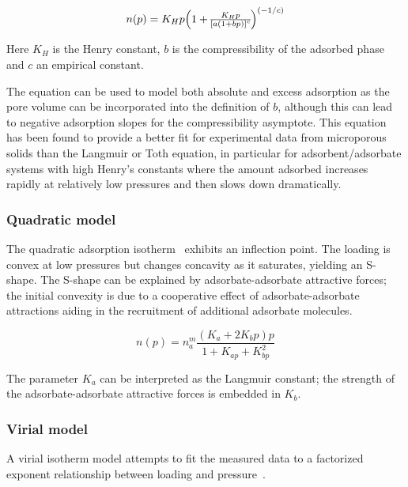 \begin{equation}\label{pyg:eqn:jseaton}
	n(p) = K_H p \Big{(1 + \frac{K_H p}{{[a {(1 + b
									p)}]}^c}\Big)}^{(-1/c)}
\end{equation}

Here \(K_H\) is the Henry constant, \(b\) is the compressibility of
the
adsorbed phase and \(c\) an empirical constant.

The equation can be used to model both absolute and excess adsorption
as the pore
volume can be incorporated into the definition of \(b\), although
this can lead
to negative adsorption slopes for the compressibility asymptote.
This equation has been found to provide a better fit for experimental
data
from microporous solids than the Langmuir or Toth equation, in
particular for
adsorbent/adsorbate systems with high Henry’s constants where the
amount adsorbed
increases rapidly at relatively low pressures and then slows down
dramatically.

\subsubsection{Quadratic model}\label{pyg:models:quadratic}

The quadratic adsorption
isotherm~\cite{hillIntroductionStatisticalThermodynamics1986}
exhibits an inflection point. The loading is convex at low
pressures but changes concavity as it saturates, yielding
an S-shape. The S-shape can be explained by adsorbate-adsorbate
attractive
forces; the initial convexity is due to a cooperative
effect of adsorbate-adsorbate attractions aiding in the recruitment
of
additional adsorbate molecules.

\begin{equation}\label{pyg:eqn:quad}
	n(p) = n_a^m \frac{(K_a + 2 K_b p)p}{1+K_{ap} + K_{bp}^2}
\end{equation}

The parameter \(K_a\) can be interpreted as the Langmuir constant;
the
strength of the adsorbate-adsorbate attractive forces is embedded in
\(K_b\).

\subsubsection{Virial model}\label{pyg:models:virial}

A virial isotherm model attempts to fit the measured data to a
factorized
exponent relationship between loading and
pressure~\cite{myersThermodynamicsAdsorptionPorous2002}.

